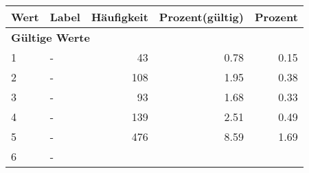      \begin{longtable}{lXrrr}
     \toprule
     \textbf{Wert} & \textbf{Label} & \textbf{Häufigkeit} & \textbf{Prozent(gültig)} & \textbf{Prozent} \\
     \endhead
     \midrule
     \multicolumn{5}{l}{\textbf{Gültige Werte}}\\

     1 &
     \multicolumn{1}{X}{ -  } &


       \num{43} &
       \num[round-mode=places,round-precision=2]{0,78} &
         \num[round-mode=places,round-precision=2]{0,15} \\

     2 &
     \multicolumn{1}{X}{ -  } &


       \num{108} &
       \num[round-mode=places,round-precision=2]{1,95} &
         \num[round-mode=places,round-precision=2]{0,38} \\

     3 &
     \multicolumn{1}{X}{ -  } &


       \num{93} &
       \num[round-mode=places,round-precision=2]{1,68} &
         \num[round-mode=places,round-precision=2]{0,33} \\

     4 &
     \multicolumn{1}{X}{ -  } &


       \num{139} &
       \num[round-mode=places,round-precision=2]{2,51} &
         \num[round-mode=places,round-precision=2]{0,49} \\

     5 &
     \multicolumn{1}{X}{ -  } &


       \num{476} &
       \num[round-mode=places,round-precision=2]{8,59} &
         \num[round-mode=places,round-precision=2]{1,69} \\

     6 &
     \multicolumn{1}{X}{ -  } &



\end{longtable}
